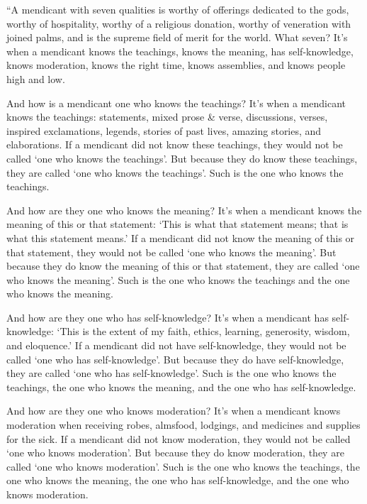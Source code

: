 \documentclass[12pt,openany]{book}%
\begin{document}
“A mendicant with seven qualities is worthy of offerings dedicated to the gods, worthy of hospitality, worthy of a religious donation, worthy of veneration with joined palms, and is the supreme field of merit for the world. What seven? It’s when a mendicant knows the teachings, knows the meaning, has self-knowledge, knows moderation, knows the right time, knows assemblies, and knows people high and low. 

And how is a mendicant one who knows the teachings? It’s when a mendicant knows the teachings: statements, mixed prose \& verse, discussions, verses, inspired exclamations, legends, stories of past lives, amazing stories, and elaborations. If a mendicant did not know these teachings, they would not be called ‘one who knows the teachings’. But because they do know these teachings, they are called ‘one who knows the teachings’. Such is the one who knows the teachings. 

And how are they one who knows the meaning? It’s when a mendicant knows the meaning of this or that statement: ‘This is what that statement means; that is what this statement means.’ If a mendicant did not know the meaning of this or that statement, they would not be called ‘one who knows the meaning’. But because they do know the meaning of this or that statement, they are called ‘one who knows the meaning’. Such is the one who knows the teachings and the one who knows the meaning. 

And how are they one who has self-knowledge? It’s when a mendicant has self-knowledge: ‘This is the extent of my faith, ethics, learning, generosity, wisdom, and eloquence.’ If a mendicant did not have self-knowledge, they would not be called ‘one who has self-knowledge’. But because they do have self-knowledge, they are called ‘one who has self-knowledge’. Such is the one who knows the teachings, the one who knows the meaning, and the one who has self-knowledge. 

And how are they one who knows moderation? It’s when a mendicant knows moderation when receiving robes, almsfood, lodgings, and medicines and supplies for the sick. If a mendicant did not know moderation, they would not be called ‘one who knows moderation’. But because they do know moderation, they are called ‘one who knows moderation’. Such is the one who knows the teachings, the one who knows the meaning, the one who has self-knowledge, and the one who knows moderation. 
\end{document}
